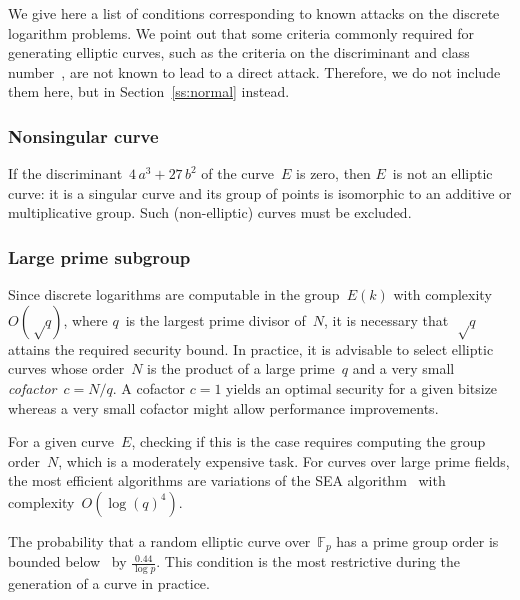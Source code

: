 \documentclass[twocolumn,letterpaper,10pt]{article}
\def\F{\mathbb{F}}
\begin{document}
We give here a list of conditions corresponding to
known attacks on the discrete logarithm problems.
We point out that some criteria commonly required
for generating elliptic curves,
such as the criteria on the discriminant and class number~\cite{rfc5639},
are not known to lead to a direct attack.
Therefore, we do not include them here,
but in Section~\ref{ss:normal} instead.


\subsubsection{Nonsingular curve}
\label{sss:singular}

If the discriminant~$4\, a^3 + 27\,b^2$
of the curve~$E$ is zero, then $E$~is not an elliptic curve:
it is a singular curve and its group of points is isomorphic to
an additive or multiplicative group.
Such (non-elliptic) curves must be excluded.

\subsubsection{Large prime subgroup}
\label{sss:prime}

Since discrete logarithms are computable in the group~$E(k)$
with complexity~$O(√q)$, where $q$~is the largest prime divisor of~$N$,
it is necessary that~$√q$ attains the required security bound.
In practice, it is advisable to select elliptic curves whose order~$N$
is the product of a large prime~$q$
and a very small \emph{cofactor}~$c = N/q$.
A cofactor $c = 1$ yields an optimal security for a given bitsize
whereas a very small cofactor might allow performance improvements.

For a given curve~$E$, checking if this is the case
requires computing the group order~$N$,
which is a moderately expensive task.
For curves over large prime fields,
the most efficient algorithms are variations
of the SEA algorithm~\cite{mc1985schoof,
jtnb1995schoof,smf2008cl} with complexity~$O(\log(q)^4)$.

The probability that a random elliptic curve over~$\F_p$
has a prime group order is bounded below~\cite{lms2000gm}
by $\frac{0.44}{\log p}$.
This condition is the most restrictive during the generation
of a curve in practice.
\end{document}
